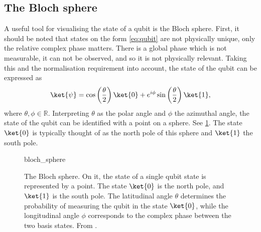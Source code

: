 \subsection{The Bloch sphere}
A useful tool for visualising the state of a qubit is the Bloch sphere.
First, it should be noted that states on the form \cref{eq:qubit} are not physically unique, only the relative complex phase matters.
There is a global phase which is not measurable, it can not be observed, and so it is not physically relevant.
Taking this and the normalisation requirement into account, the state of the qubit can be expressed as
\begin{equation}
    \ket{\psi} = \cos\left(\frac{\theta}{2}\right) \ket{0} + e^{i\phi} \sin\left(\frac{\theta}{2}\right) \ket{1},
    \label{eq:bloch}
\end{equation}
where $\theta, \phi \in \mathbb{R}$.
Interpreting $\theta$ as the polar angle and $\phi$ the azimuthal angle, the state of the qubit can be identified with a point on a sphere.
See \cref{fig:bloch}.
The state $\ket{0}$ is typically thought of as the north pole of this sphere and $\ket{1}$ the south pole.

\begin{figure}
    \centering
    \def\svgwidth{0.5\textwidth}
    {bloch_sphere}
    \caption{
        The Bloch sphere.
        On it, the state of a single qubit state is represented by a point.
        The state $\ket{0}$ is the north pole, and $\ket{1}$ is the south pole.
        The latitudinal angle $\theta$ determines the probability of measuring the qubit in the state $\ket{0}$, while the longitudinal angle $\phi$ corresponds to the complex phase between the two basis states.
        From \cite{wikipedia_bloch}.
    }
    \label{fig:bloch}
\end{figure}


